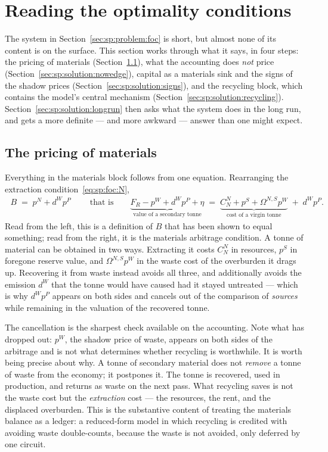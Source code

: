 ﻿\section{Reading the optimality conditions}\label{sec:sp:solution}

The system in Section~\ref{sec:sp:problem:foc} is short, but almost none of its content is on the
surface. This section works through what it says, in four steps: the pricing of materials
(Section~\ref{sec:sp:solution:materials}), what the accounting does \emph{not} price
(Section~\ref{sec:sp:solution:nowedge}), capital as a materials sink and the signs of the shadow
prices (Section~\ref{sec:sp:solution:signs}), and the recycling block, which contains the model's
central mechanism (Section~\ref{sec:sp:solution:recycling}). Section~\ref{sec:sp:solution:longrun}
then asks what the system does in the long run, and gets a more definite --- and more awkward ---
answer than one might expect.


\subsection{The pricing of materials}\label{sec:sp:solution:materials}

Everything in the materials block follows from one equation. Rearranging the extraction
condition~\eqref{eq:sp:foc:N},
\begin{align}
\boxed{\;B\;=\;p^N+d^Wp^P\;}
\qquad\text{that is}\qquad
\underbrace{F_R-p^W+d^Wp^P+\eta}_{\text{value of a secondary tonne}}
\;=\;
\underbrace{C^N_N+p^S+\Omega^{N,S}p^W}_{\text{cost of a virgin tonne}}
\;+\;d^Wp^P .
\label{eq:sp:solution:arbitrage}
\end{align}
Read from the left, this is a definition of $B$ that has been shown to equal something; read from
the right, it is the materials arbitrage condition. A tonne of material can be obtained in two ways.
Extracting it costs $C^N_N$ in resources, $p^S$ in foregone reserve value, and $\Omega^{N,S}p^W$ in
the waste cost of the overburden it drags up. Recovering it from waste instead avoids all three,
and additionally avoids the emission $d^W$ that the tonne would have caused had it stayed
untreated --- which is why $d^Wp^P$ appears on both sides and cancels out of the comparison of
\emph{sources} while remaining in the valuation of the recovered tonne.

The cancellation is the sharpest check available on the accounting. Note what has dropped out:
$p^W$, the shadow price of waste, appears on both sides of the arbitrage and is not what determines
whether recycling is worthwhile. It is worth being precise about why. A tonne of secondary material
does not \emph{remove} a tonne of waste from the economy; it postpones it. The tonne is recovered,
used in production, and returns as waste on the next pass. What recycling saves is not the waste
cost but the \emph{extraction} cost --- the resources, the rent, and the displaced overburden. This
is the substantive content of treating the materials balance as a ledger: a reduced-form model in
which recycling is credited with avoiding waste double-counts, because the waste is not avoided,
only deferred by one circuit.

